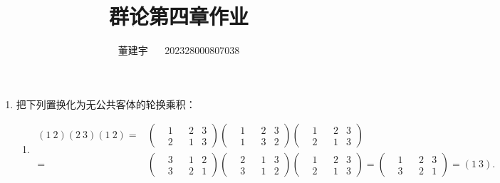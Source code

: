\documentclass[reqno,a4paper,12pt]{amsart}
\title{群论第四章作业}
\author{董建宇 ~~ 202328000807038}
\begin{document}
\maketitle

\titleformat{\section}[hang]{\small}{\thesection}{0.8em}{}{}
\titleformat{\subsection}[hang]{\small}{\thesubsection}{0.8em}{}{}

\begin{enumerate}[1.]

\item 把下列置换化为无公共客体的轮换乘积：
\begin{enumerate}[(1)]
\item 
\begin{align*}
	(1 \ 2)(2 \ 3)(1 \ 2) =& \left( \begin{aligned}
		&1 & &2 & 3 \\
		&2 & &1 & 3
	\end{aligned}\right)\left( \begin{aligned}
		&1 & &2 & 3 \\
		&1 & &3 & 2
	\end{aligned}\right)\left( \begin{aligned}
		&1 & &2 & 3 \\
		&2 & &1 & 3
	\end{aligned}\right) \\
	=& \left( \begin{aligned}
		&3 & &1 & 2 \\
		&3 & &2 & 1
	\end{aligned}\right)\left( \begin{aligned}
		&2 & &1 & 3 \\
		&3 & &1 & 2
	\end{aligned}\right)\left( \begin{aligned}
		&1 & &2 & 3 \\
		&2 & &1 & 3
	\end{aligned}\right) = \left( \begin{aligned}
		&1 & &2 & 3 \\
		&3 & &2 & 1
	\end{aligned}\right) = (1 \ 3).
\end{align*}


\end{enumerate}
\end{enumerate}
\end{document}
